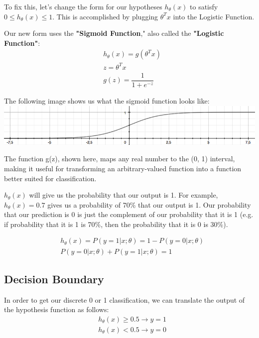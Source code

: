 \documentclass{article}
\begin{document}
To fix this, let’s change the form for our hypotheses $h_\theta (x)$ to satisfy $0 \leq h_\theta (x) \leq 1$. This is accomplished by plugging $\theta^Tx$ into the Logistic Function.

Our new form uses the \textbf{"Sigmoid Function}," also called the \textbf{"Logistic Function"}:
\begin{align*}
	& h_\theta (x) = g ( \theta^T x ) \\ 
	& z = \theta^T x \\
	& g(z) = \dfrac{1}{1 + e^{-z}}
\end{align*}

The following image shows us what the sigmoid function looks like:\\
\includegraphics[width=\textwidth]{Logistic_function}

The function g(z), shown here, maps any real number to the (0, 1) interval, making it useful for transforming an arbitrary-valued function into a function better suited for classification.

$h_\theta(x)$ will give us the probability that our output is 1. For example, $h_\theta(x)=0.7$ gives us a probability of 70\% that our output is 1. Our probability that our prediction is 0 is just the complement of our probability that it is 1 (e.g. if probability that it is 1 is 70\%, then the probability that it is 0 is 30\%).

\begin{align*}
	& h_\theta(x) = P(y=1 | x ; \theta) = 1 - P(y=0 | x ; \theta) \\
	& P(y = 0 | x;\theta) + P(y = 1 | x ; \theta) = 1
\end{align*}

\subsection{Decision Boundary}
In order to get our discrete 0 or 1 classification, we can translate the output of the hypothesis function as follows:
\begin{align*}
	&h_\theta(x) \geq 0.5 \rightarrow y = 1 \\
	&h_\theta(x) < 0.5 \rightarrow y = 0 \\
\end{align*}
\end{document}
